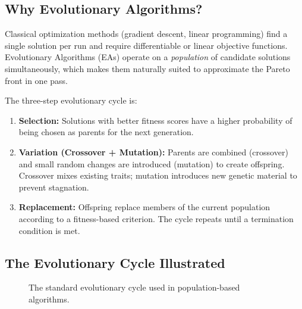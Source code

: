 \documentclass[12pt,a4paper]{article}
\begin{document}
\subsection{Why Evolutionary Algorithms?}

Classical optimization methods (gradient descent, linear programming) find a single solution per run and require differentiable or linear objective functions. Evolutionary Algorithms (EAs) operate on a \emph{population} of candidate solutions simultaneously, which makes them naturally suited to approximate the Pareto front in one pass.

The three-step evolutionary cycle is:

\begin{enumerate}[leftmargin=1.5cm]
    \item \textbf{Selection:} Solutions with better fitness scores have a higher probability of being chosen as parents for the next generation.
    \item \textbf{Variation (Crossover + Mutation):} Parents are combined (crossover) and small random changes are introduced (mutation) to create offspring. Crossover mixes existing traits; mutation introduces new genetic material to prevent stagnation.
    \item \textbf{Replacement:} Offspring replace members of the current population according to a fitness-based criterion. The cycle repeats until a termination condition is met.
\end{enumerate}

\subsection{The Evolutionary Cycle Illustrated}

\begin{figure}[H]
\centering
{}
\caption{The standard evolutionary cycle used in population-based algorithms.}
\label{fig:ea_cycle}
\end{figure}
\end{document}
